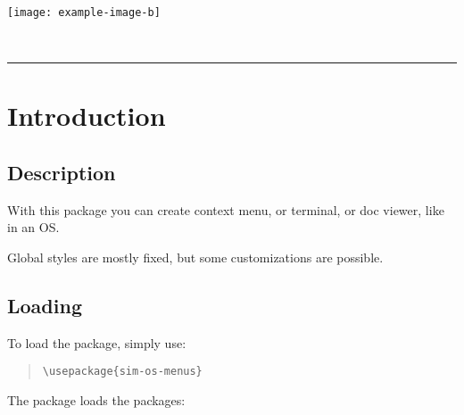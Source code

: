 \documentclass[11pt,a4paper]{ltxdoc}
\begin{document}
\begin{tcolorbox}[colframe=lightgray,colback=lightgray!5]
\begin{IMGViewer}[Width=12cm]{}
\texttt{[image: example-image-b]}
\end{IMGViewer}
\end{tcolorbox}

\begin{tcolorbox}[colframe=lightgray,colback=lightgray!5]
\end{tcolorbox}

\vfill~

\pagebreak


\hypertarget{matoc}{}

\tableofcontents

\vspace*{5mm}

\hrule

\vspace*{5mm}

\section{Introduction}

\subsection{Description}

With this package you can create context menu, or terminal, or doc viewer, like in an OS.

Global styles are mostly fixed, but some customizations are possible.

\subsection{Loading}

To load the package, simply use:

\begin{quote}
\begin{verbatim}
\usepackage{sim-os-menus}
\end{verbatim}
\end{quote}

The package loads the packages:
\end{document}
